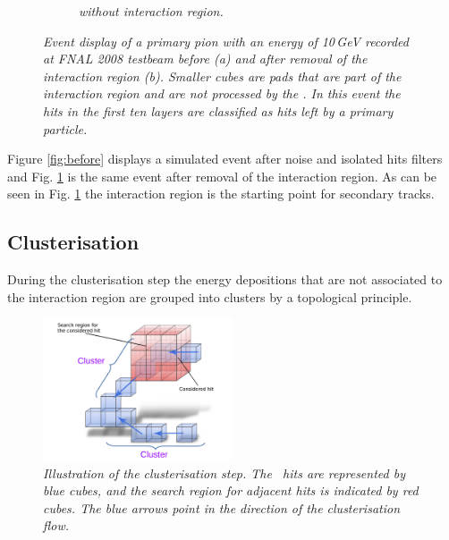 \begin{figure}
\begin{subfigure}{0.5\textwidth}
		\caption{\label{fig:after} \sl without interaction region.}
	\end{subfigure}
	\caption{ \sl Event display of a primary pion with an energy of 10\,GeV recorded at FNAL 2008 testbeam before \textit{(a)} and after removal of the interaction region \textit{(b)}. Smaller cubes are pads that are part of the interaction region and are not processed by the \tfa . In this event the hits in the first ten layers are classified as hits left by a primary particle.}
	\label{fig:test}
\end{figure}

Figure \ref{fig:before} displays a simulated event after noise and isolated hits filters and Fig. \ref{fig:after} is the same event after removal of the interaction region. As can be seen in Fig. \ref{fig:after} the interaction region is the starting point for secondary tracks.



\subsection{Clusterisation}\label{sec:cluster}
During the clusterisation step the energy depositions that are not associated to the interaction region are grouped into clusters by a topological principle. %

\begin{figure}
	\centering
	\includegraphics[width=0.5\textwidth]{ECAL/graphics/demo-v3.pdf}
	\caption{\label{fig:democluster} \sl Illustration of the clusterisation step. The \ecal\ hits are represented by blue cubes, and the search region for adjacent hits is indicated by red cubes. The blue arrows point in the direction of the clusterisation flow. }
\end{figure}

